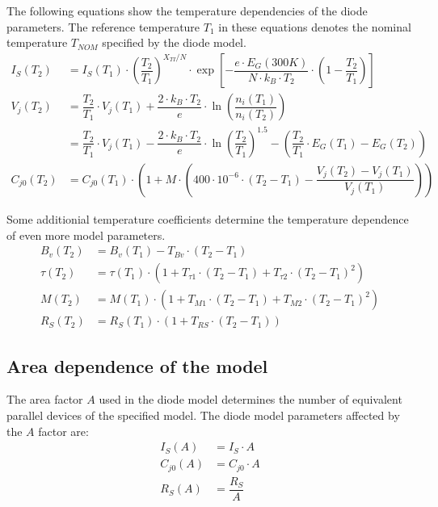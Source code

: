 The following equations show the temperature dependencies of the diode
parameters.  The reference temperature $T_1$ in these equations
denotes the nominal temperature $T_{NOM}$ specified by the diode
model.
\begin{align}
I_S\left(T_2\right) &= I_S\left(T_1\right)\cdot \left(\dfrac{T_2}{T_1}\right)^{X_{TI} / N} \cdot \exp{\left[-\dfrac{e\cdot E_G\left(300K\right)}{N\cdot k_B\cdot T_2}\cdot \left(1 - \dfrac{T_2}{T_1}\right)\right]}\\
V_j\left(T_2\right) &= \dfrac{T_2}{T_1}\cdot V_j\left(T_1\right) + \dfrac{2\cdot k_B\cdot T_2}{e} \cdot \ln{\left(\dfrac{n_i\left(T_1\right)}{n_i\left(T_2\right)}\right)}\\
 &= \dfrac{T_2}{T_1}\cdot V_j\left(T_1\right) - \dfrac{2\cdot k_B\cdot T_2}{e} \cdot \ln{\left(\dfrac{T_2}{T_1}\right)^{1.5}} - \left(\dfrac{T_2}{T_1} \cdot E_G\left(T_1\right) - E_G\left(T_2\right)\right)\\
C_{j0}\left(T_2\right) &= C_{j0}\left(T_1\right)\cdot\left(1 + M\cdot\left(400\cdot 10^{-6} \cdot\left(T_2 - T_1\right) - \dfrac{V_j\left(T_2\right) - V_j\left(T_1\right)}{V_j\left(T_1\right)}\right)\right)
\end{align}

Some additionial temperature coefficients determine the temperature
dependence of even more model parameters.
\begin{align}
B_{v}\left(T_2\right) &= B_{v}\left(T_1\right) - T_{Bv}\cdot\left(T_2 - T_1\right)\\
\tau\left(T_2\right) &= \tau\left(T_1\right)\cdot\left(1 + T_{\tau 1}\cdot\left(T_2 - T_1\right) + T_{\tau 2}\cdot\left(T_2 - T_1\right)^2\right)\\
M\left(T_2\right) &= M\left(T_1\right)\cdot\left(1 + T_{M1}\cdot\left(T_2 - T_1\right) + T_{M2}\cdot\left(T_2 - T_1\right)^2\right)\\
R_S\left(T_2\right) &= R_S\left(T_1\right)\cdot\left(1 + T_{RS}\cdot\left(T_2 - T_1\right)\right)
\end{align}

\subsection{Area dependence of the model}

The area factor $A$ used in the diode model determines the number of
equivalent parallel devices of the specified model.  The diode model
parameters affected by the $A$ factor are:
\begin{align}
I_S\left(A\right) &= I_S\cdot A\\
C_{j0}\left(A\right) &= C_{j0}\cdot A\\
R_S\left(A\right) &= \dfrac{R_S}{A}
\end{align}

